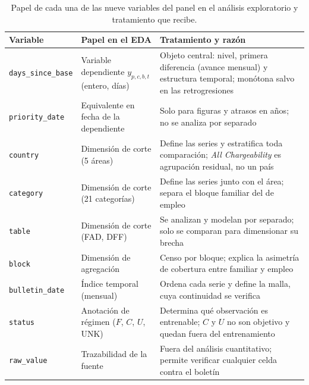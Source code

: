 \documentclass[12pt,letterpaper]{report}
\begin{document}
\begin{table}[htbp]
\centering
\footnotesize
\caption[Variables del panel en el análisis exploratorio]{Papel de cada una de las nueve
variables del panel en el análisis exploratorio y tratamiento que recibe.}
\label{tab:eda_variables}
\begin{tabular}{p{3.2cm}>{\raggedright\arraybackslash}p{3.3cm}>{\raggedright\arraybackslash}p{7.1cm}}
\toprule
\rowcolor{uacjblue!15}
\textbf{Variable} & \textbf{Papel en el EDA} & \textbf{Tratamiento y razón} \\ \midrule
\texttt{days\_since\_base} & Variable dependiente $y_{p,c,b,t}$ (entero, días) &
Objeto central: nivel, primera diferencia (avance mensual) y estructura temporal; monótona salvo
en las retrogresiones \\
\texttt{priority\_date} & Equivalente en fecha de la dependiente &
Solo para figuras y atrasos en años; no se analiza por separado \\
\texttt{country} & Dimensión de corte (5 áreas) &
Define las series y estratifica toda comparación; \textit{All Chargeability} es agrupación
residual, no un país \\
\texttt{category} & Dimensión de corte (21 categorías) &
Define las series junto con el área; separa el bloque familiar del de empleo \\
\texttt{table} & Dimensión de corte (FAD, DFF) &
Se analizan y modelan por separado; solo se comparan para dimensionar su brecha \\
\texttt{block} & Dimensión de agregación &
Censo por bloque; explica la asimetría de cobertura entre familiar y empleo \\
\texttt{bulletin\_date} & Índice temporal (mensual) &
Ordena cada serie y define la malla, cuya continuidad se verifica \\
\texttt{status} & Anotación de régimen ($F$, $C$, $U$, UNK) &
Determina qué observación es entrenable; $C$ y $U$ no son objetivo y quedan fuera del
entrenamiento \\
\texttt{raw\_value} & Trazabilidad de la fuente &
Fuera del análisis cuantitativo; permite verificar cualquier celda contra el boletín \\
\bottomrule
\end{tabular}
\end{table}
\end{document}
